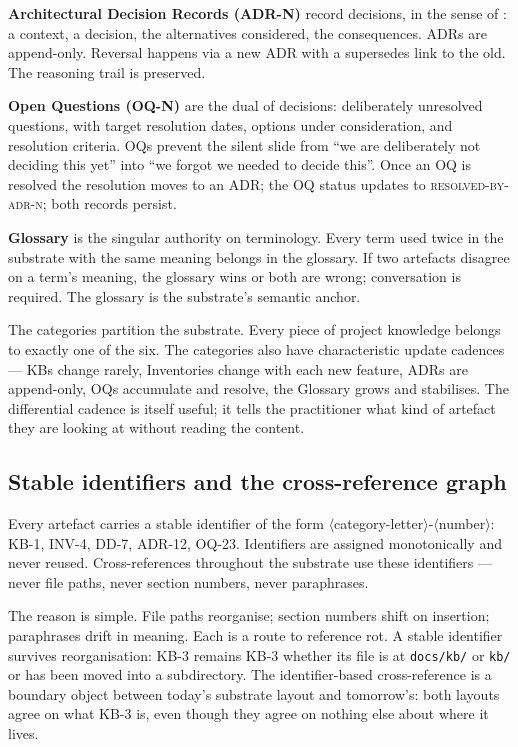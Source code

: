 \documentclass[11pt,a4paper,twocolumn]{article}
\begin{document}
\textbf{Architectural Decision Records (ADR-N)} record decisions, in
the sense of \citet{nygard2011adr}: a context, a decision, the
alternatives considered, the consequences. ADRs are append-only.
Reversal happens via a new ADR with a supersedes link to the old.
The reasoning trail is preserved.

\textbf{Open Questions (OQ-N)} are the dual of decisions:
deliberately unresolved questions, with target resolution dates,
options under consideration, and resolution criteria. OQs prevent
the silent slide from ``we are deliberately not deciding this yet''
into ``we forgot we needed to decide this''. Once an OQ is resolved
the resolution moves to an ADR; the OQ status updates to
\textsc{resolved-by-adr-n}; both records persist.

\textbf{Glossary} is the singular authority on terminology. Every
term used twice in the substrate with the same meaning belongs in
the glossary. If two artefacts disagree on a term's meaning, the
glossary wins or both are wrong; conversation is required. The
glossary is the substrate's semantic anchor.

The categories partition the substrate. Every piece of project
knowledge belongs to exactly one of the six. The categories also
have characteristic update cadences --- KBs change rarely,
Inventories change with each new feature, ADRs are append-only, OQs
accumulate and resolve, the Glossary grows and stabilises. The
differential cadence is itself useful; it tells the practitioner
what kind of artefact they are looking at without reading the
content.

\subsection{Stable identifiers and the cross-reference graph}

Every artefact carries a stable identifier of the form
$\langle$category-letter$\rangle$-$\langle$number$\rangle$: KB-1,
INV-4, DD-7, ADR-12, OQ-23. Identifiers are assigned monotonically
and never reused. Cross-references throughout the substrate use
these identifiers --- never file paths, never section numbers,
never paraphrases.

The reason is simple. File paths reorganise; section numbers shift
on insertion; paraphrases drift in meaning. Each is a route to
reference rot. A stable identifier survives reorganisation: KB-3
remains KB-3 whether its file is at \texttt{docs/kb/} or
\texttt{kb/} or has been moved into a subdirectory. The
identifier-based cross-reference is a boundary object
\citep{star1989boundary} between today's substrate layout and
tomorrow's: both layouts agree on what KB-3 is, even though they
agree on nothing else about where it lives.
\end{document}
